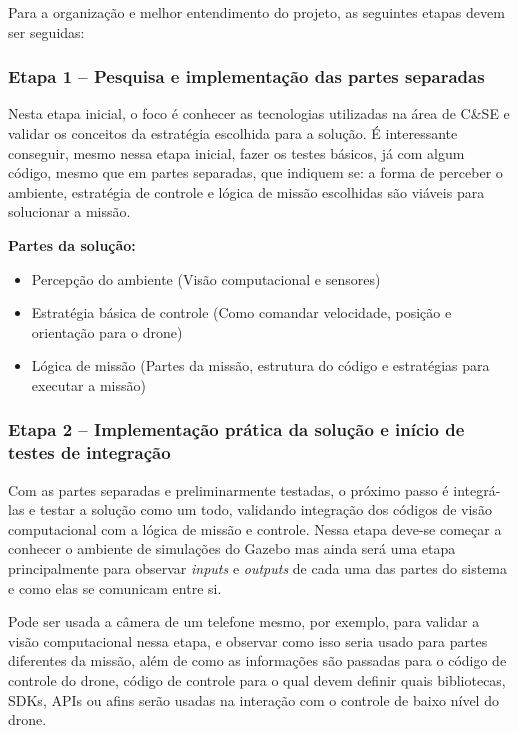 Para a organização e melhor entendimento do projeto, as seguintes etapas devem ser seguidas:

\subsubsection*{Etapa 1 – Pesquisa e implementação das partes separadas}

Nesta etapa inicial, o foco é conhecer as tecnologias utilizadas na área de C\&SE e validar os conceitos da estratégia escolhida para a solução. É interessante conseguir, mesmo nessa etapa inicial, fazer os testes básicos, já com algum código, mesmo que em partes separadas, que indiquem se: a forma de perceber o ambiente, estratégia de controle e lógica de missão escolhidas são viáveis para solucionar a missão.

\textbf{Partes da solução:}
\begin{itemize}
    \item Percepção do ambiente (Visão computacional e sensores)
    \item Estratégia básica de controle (Como comandar velocidade, posição e orientação para o drone)
    \item Lógica de missão (Partes da missão, estrutura do código e estratégias para executar a missão)
\end{itemize}

\subsubsection*{Etapa 2 – Implementação prática da solução e início de testes de integração}

Com as partes separadas e preliminarmente testadas, o próximo passo é integrá-las e testar a solução como um todo, validando integração dos códigos de visão computacional com a lógica de missão e controle. Nessa etapa deve-se começar a conhecer o ambiente de simulações do Gazebo mas ainda será uma etapa principalmente para observar \textit{inputs} e \textit{outputs} de cada uma das partes do sistema e como elas se comunicam entre si. 

Pode ser usada a câmera de um telefone mesmo, por exemplo, para validar a visão computacional nessa etapa, e observar como isso seria usado para partes diferentes da missão, além de como as informações são passadas para o código de controle do drone, código de controle para o qual devem definir quais bibliotecas, SDKs, APIs ou afins serão usadas na interação com o controle de baixo nível do drone.

